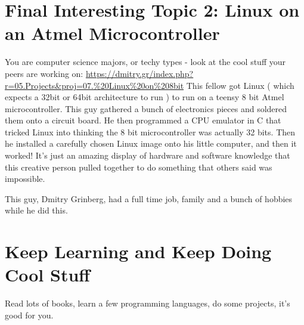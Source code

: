 \documentclass[10pt]{article}
\begin{document}
\section{Final Interesting Topic 2: Linux on an Atmel Microcontroller}
You are computer science majors, or techy types - look at the cool stuff your
peers are working on:
\url{https://dmitry.gr/index.php?r=05.Projects&proj=07.%20Linux%20on%208bit}
This fellow got Linux ( which expects a 32bit or 64bit architecture to run ) to
run on a teensy 8 bit Atmel microcontroller. This guy gathered a bunch of
electronics pieces and soldered them onto a circuit board. He then programmed a
CPU emulator in C that tricked Linux into thinking the 8 bit microcontroller 
was actually 32 bits. Then he installed a carefully chosen Linux image onto his
little computer, and then it worked! 
It's just an amazing display of hardware and software knowledge that this
creative person  pulled together to do something that others said was
impossible. 

This guy, Dmitry Grinberg, had a full time job, family and a bunch of hobbies
while he did this.

\section{Keep Learning and Keep Doing Cool Stuff}
Read lots of books, learn a few programming languages, do some projects, it's
good for you.
\end{document}
